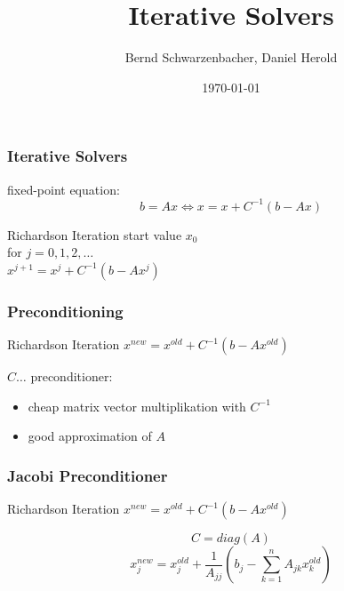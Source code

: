 \documentclass{beamer}
\title[Iterative Solvers]{Iterative Solvers} %
\author{Bernd Schwarzenbacher, Daniel Herold} %
\institute[TU Wien] %
{Technical University of Vienna \\ %
\medskip
}
\date{\today} %
\begin{document}
\begin{frame}
\titlepage %
\end{frame}




\begin{frame}
\frametitle{Iterative Solvers}
fixed-point equation:
$$b = Ax \iff x = x + C^{-1} (b-Ax)$$
\begin{block}{Richardson Iteration}
start value $x_{0}$ \\
for $j = 0, 1, 2, \dots$ \\
\quad $x^{j+1} = x^{j} + C^{-1} (b - Ax^{j})$
\end{block}
\end{frame}

\begin{frame}
\frametitle{Preconditioning}
\begin{block}{Richardson Iteration}
$x^{new} = x^{old} + C^{-1} (b - Ax^{old})$
\end{block}
$C \dots$ preconditioner:
\begin{itemize}
  \item cheap matrix vector multiplikation with $C^{-1}$
  \item good approximation of $A$
\end{itemize}
\end{frame}

\begin{frame}
\frametitle{Jacobi Preconditioner}
\begin{block}{Richardson Iteration}
$x^{new} = x^{old} + C^{-1} (b - Ax^{old})$
\end{block}
$$C = diag(A)$$
$$x_j^{new} = x_j^{old} + \frac{1}{A_{jj}} \left(b_{j} -
\sum_{k=1}^{n} A_{jk} x_k^{old}\right)$$
\end{frame}
\end{document}
